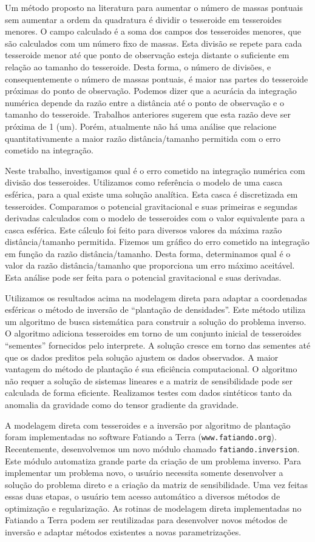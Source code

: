 \documentclass[12pt]{letter}
\begin{document}
Um método proposto na literatura
para aumentar o número de massas pontuais
sem aumentar a ordem da quadratura
é dividir o tesseroide em tesseroides menores.
O campo calculado
é a soma dos campos dos tesseroides menores,
que são calculados
com um número fixo de massas.
Esta divisão se repete
para cada tesseroide menor
até que ponto de observação
esteja distante o suficiente
em relação ao tamanho do tesseroide.
Desta forma,
o número de divisões,
e consequentemente o número de massas pontuais,
é maior nas partes do tesseroide
próximas do ponto de observação.
Podemos dizer que
a acurácia da integração numérica
depende da razão entre
a distância até o ponto de observação
e o tamanho do tesseroide.
Trabalhos anteriores
sugerem que esta razão
deve ser próxima de 1 (um).
Porém,
atualmente não há uma análise
que relacione quantitativamente
a maior razão distância/tamanho permitida
com o erro cometido na integração.

Neste trabalho,
investigamos qual é o erro
cometido na integração numérica
com divisão dos tesseroides.
Utilizamos como referência
o modelo de uma casca esférica,
para a qual existe
uma solução analítica.
Esta casca é discretizada em tesseroides.
Comparamos o potencial gravitacional
e suas primeiras e segundas derivadas
calculados com o modelo de tesseroides
com o valor equivalente
para a casca esférica.
Este cálculo foi feito
para diversos valores
da máxima razão distância/tamanho permitida.
Fizemos um gráfico
do erro cometido na integração
em função da razão distância/tamanho.
Desta forma,
determinamos qual é o valor
da razão distância/tamanho
que proporciona um erro máximo aceitável.
Esta análise pode ser feita
para o potencial gravitacional e suas derivadas.

Utilizamos os resultados acima
na modelagem direta
para adaptar a coordenadas esféricas
o método de inversão de ``plantação de densidades''.
Este método utiliza
um algoritmo de busca sistemática
para construir a solução do problema inverso.
O algoritmo adiciona tesseroides
em torno de um conjunto inicial
de tesseroides ``sementes''
fornecidos pelo interprete.
A solução cresce
em torno das sementes
até que os dados preditos pela solução
ajustem os dados observados.
A maior vantagem do método de plantação
é sua eficiência computacional.
O algoritmo não requer
a solução de sistemas lineares
e a matriz de sensibilidade
pode ser calculada de forma eficiente.
Realizamos testes
com dados sintéticos
tanto da anomalia da gravidade
como do tensor gradiente da gravidade.

A modelagem direta com tesseroides
e a inversão por algoritmo de plantação
foram implementadas no software
Fatiando a Terra (\texttt{www.fatiando.org}).
Recentemente,
desenvolvemos um novo módulo
chamado \texttt{fatiando.inversion}.
Este módulo
automatiza grande parte
da criação de um problema inverso.
Para implementar um problema novo,
o usuário necessita somente desenvolver
a solução do problema direto
e a criação da matriz de sensibilidade.
Uma vez feitas essas duas etapas,
o usuário tem acesso automático
a diversos métodos de optimização e regularização.
As rotinas de modelagem direta
implementadas no Fatiando a Terra
podem ser reutilizadas
para desenvolver novos métodos de inversão
e adaptar métodos existentes a novas parametrizações.
\end{document}
